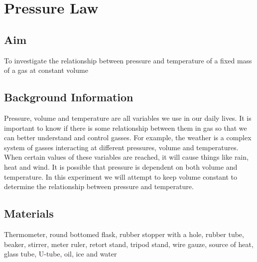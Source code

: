 \chapter{Pressure Law}

\section{Aim}
To investigate the relationship between pressure and temperature of a fixed mass of a gas at constant volume

\section{Background Information}
Pressure, volume and temperature are all variables we use in our daily lives. It is important to know if there is some relationship between them in gas so that we can better understand and control gasses. For example, the weather is a complex system of gasses interacting at different pressures, volume and temperatures. When certain values of these variables are reached, it will cause things like rain, heat and wind. It is possible that pressure is dependent on both volume and temperature. In this experiment we will attempt to keep volume constant to determine the relationship between pressure and temperature. 

\section{Materials}
Thermometer, round bottomed flask, rubber stopper with a hole, rubber tube, beaker, stirrer, meter ruler, retort stand, tripod stand, wire gauze, source of heat, glass tube, U-tube, oil, ice and water

